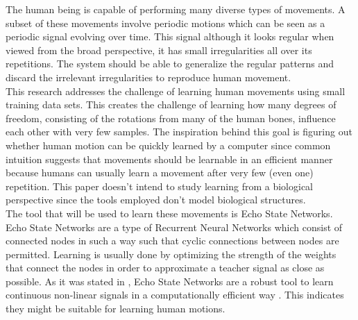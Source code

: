 \documentclass[letterpaper,9pt]{article}
\begin{document}
The human being is capable of performing many diverse types of movements. A subset of these movements involve periodic motions which can be seen as a periodic signal evolving over time. This signal although it looks regular when viewed from the broad perspective, it has small irregularities all over its repetitions. The system should be able to generalize the regular patterns and discard the irrelevant irregularities to reproduce human movement.\\

This research addresses the challenge of learning human movements using small training data sets. This creates the challenge of learning how many degrees of freedom, consisting of the rotations from many of the human bones, influence each other with very few samples. The inspiration behind this goal is figuring out whether human motion can be quickly learned by a computer since common intuition suggests that movements should be learnable in an efficient manner because humans can usually learn a movement after very few (even one) repetition. This paper doesn't intend to study learning from a biological perspective since the tools employed don't model biological structures.\\

The tool that will be used to learn these movements is Echo State Networks. Echo State Networks are a type of Recurrent Neural Networks which consist of connected nodes in such a way such that cyclic connections between nodes are permitted. Learning is usually done by optimizing the strength of the weights that connect the nodes in order to approximate a teacher signal as close as possible. As it was stated in \cite{JaegerESNTutorial}, Echo State Networks are a robust tool to learn continuous non-linear signals in a computationally efficient way \cite{Jaeger05TrainingRRN}. This indicates they might be suitable for learning human motions. \\
\end{document}
